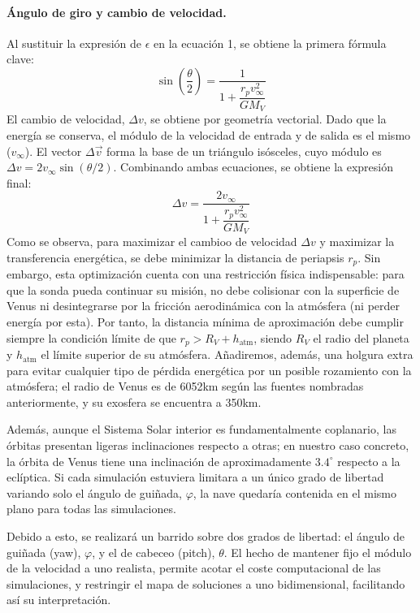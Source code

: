 \paragraph{Ángulo de giro y cambio de velocidad.}
Al sustituir la expresión de $\epsilon$ en la ecuación 1, se obtiene la primera fórmula clave:
\begin{equation}
    \sin\left(\frac{\theta}{2}\right) = \frac{1}{1 + \dfrac{r_p v_\infty^2}{G M_V}}
\end{equation}
El cambio de velocidad, $\Delta v$, se obtiene por geometría vectorial. 
Dado que la energía se conserva, el módulo de la velocidad de entrada y de salida es el mismo ($v_\infty$). 
El vector $\Delta \vec{v}$ forma la base de un triángulo isósceles, cuyo módulo es 
$\Delta v = 2 v_\infty \sin(\theta/2)$. Combinando ambas ecuaciones, se obtiene la expresión final:
\begin{equation}
    \Delta v = \frac{2 v_\infty}{1 + \dfrac{r_p v_\infty^2}{G M_V}}
\end{equation}
Como se observa, para maximizar el cambioo de velocidad $\Delta v$ y maximizar la transferencia 
energética, se debe minimizar la distancia de periapsis $r_p$.
Sin embargo, esta optimización cuenta con una restricción física indispensable: 
para que la sonda pueda continuar su misión, no debe colisionar con la superficie de Venus 
ni desintegrarse por la fricción aerodinámica con la atmósfera (ni perder energía por esta). 
\newpage
Por tanto, la distancia mínima de aproximación debe cumplir siempre la condición límite de que 
$r_p > R_V + h_{\text{atm}}$, siendo $R_V$ el radio del planeta y $h_{\text{atm}}$ el 
límite superior de su atmósfera.
Añadiremos, además, una holgura extra para evitar cualquier tipo de pérdida energética por un posible
rozamiento con la atmósfera; el radio de Venus es de 6052km según las fuentes  
nombradas anteriormente, y su exosfera se encuentra a 350km.

Además, aunque el Sistema Solar interior es fundamentalmente coplanario, las órbitas presentan ligeras inclinaciones respecto a otras; 
en nuestro caso concreto, la órbita de Venus tiene una inclinación de aproximadamente $3.4^\circ$ respecto a la eclíptica. 
Si cada simulación estuviera limitara a un único grado de libertad variando solo el ángulo de guiñada, $\varphi$,
la nave quedaría contenida en el mismo plano para todas las simulaciones.

Debido a esto, se realizará un barrido sobre dos grados de libertad: el ángulo de guiñada (yaw), $\varphi$, y el de cabeceo
(pitch), $\theta$.
El hecho de mantener fijo el módulo de la velocidad a uno realista, permite acotar el coste computacional de las simulaciones,
y restringir el mapa de soluciones a uno bidimensional, facilitando así su interpretación.